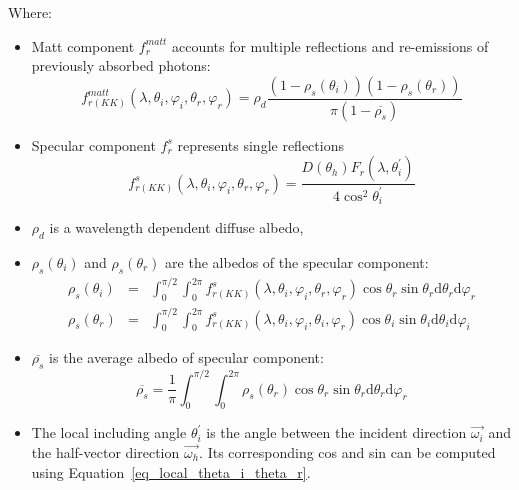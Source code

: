 Where:
\begin{itemize}
    \item Matt component $f_r^{matt}$ accounts for multiple reflections and re-emissions of previously absorbed photons:
          \[
              f_{r(KK)}^{matt}(\lambda, \theta_i, \varphi_i, \theta_r, \varphi_r) = \rho_d%
              \frac{(1 - \rho_s(\theta_i)) (1 - \rho_s(\theta_r))}%
              {\pi (1 - \overline{\rho_s})}
          \]

    \item Specular component $f_r^{s}$ represents single reflections
          \[
              f_{r(KK)}^{s}(\lambda, \theta_i, \varphi_i, \theta_r, \varphi_r) = %
              \frac{D(\theta_h) F_r(\lambda, \theta_i^\prime)}%
              {4 \cos^2\theta_i^\prime}
          \]

    \item $\rho_d$  is a wavelength dependent diffuse albedo,

    \item $\rho_s(\theta_i)$ and $\rho_s(\theta_r)$ are the albedos of the specular component:
          \[
              \begin{array}{lll}
                  \rho_s(\theta_i) & = & \int_{0}^{\pi/2} \int_{0}^{2\pi} %
                  f_{r(KK)}^{s}(\lambda, \theta_i, \varphi_i, \theta_r, \varphi_r)%
                  \cos\theta_r \sin \theta_r \mathrm{d} \theta_r \mathrm{d} \varphi_r   \\
                  \rho_s(\theta_r) & = & \int_{0}^{\pi/2} \int_{0}^{2\pi} %
                  f_{r(KK)}^{s}(\lambda, \theta_i, \varphi_i, \theta_i, \varphi_r)%
                  \cos\theta_i \sin \theta_i \mathrm{d} \theta_i \mathrm{d} \varphi_i%
              \end{array}
          \]

    \item $\overline{\rho_s}$ is the average albedo of specular component:
          \[
              \overline{\rho_s} = \frac{1}{\pi}%
              \int_{0}^{\pi/2} \int_{0}^{2\pi}%
              \rho_s(\theta_r) \cos\theta_r \sin \theta_r\mathrm{d} \theta_r \mathrm{d} \varphi_r
          \]
    \item The local including angle $\theta_i^\prime$ is the angle between the incident direction $\overrightarrow{\omega_i}$ and the half-vector direction $\overrightarrow{\omega_h}$.
          Its corresponding cos and sin can be computed using Equation~\eqref{eq_local_theta_i_theta_r}.


\end{itemize}
